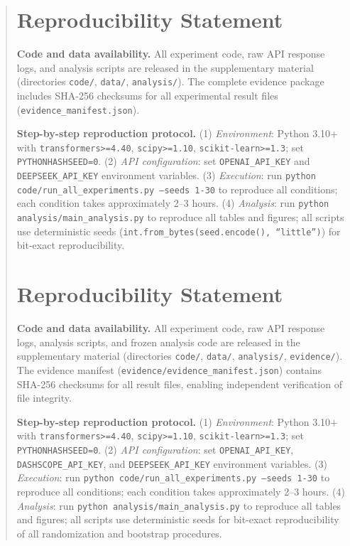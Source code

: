 \documentclass[11pt]{article}
\begin{document}
\begin{abstract}
\section*{Reproducibility Statement}

\textbf{Code and data availability.} All experiment code, raw API response logs, and analysis scripts are released in the supplementary material (directories \texttt{code/}, \texttt{data/}, \texttt{analysis/}). The complete evidence package includes SHA-256 checksums for all experimental result files (\texttt{evidence\_manifest.json}).

\textbf{Step-by-step reproduction protocol.} (1) \textit{Environment}: Python 3.10+ with \texttt{transformers>=4.40}, \texttt{scipy>=1.10}, \texttt{scikit-learn>=1.3}; set \texttt{PYTHONHASHSEED=0}. (2) \textit{API configuration}: set \texttt{OPENAI\_API\_KEY} and \texttt{DEEPSEEK\_API\_KEY} environment variables. (3) \textit{Execution}: run \texttt{python code/run\_all\_experiments.py --seeds 1-30} to reproduce all conditions; each condition takes approximately 2--3 hours. (4) \textit{Analysis}: run \texttt{python analysis/main\_analysis.py} to reproduce all tables and figures; all scripts use deterministic seeds (\texttt{int.from\_bytes(seed.encode(), ``little'')}) for bit-exact reproducibility.


\section*{Reproducibility Statement}
\label{sec:reproducibility}

\textbf{Code and data availability.} All experiment code, raw API response logs, analysis scripts, and frozen analysis code are released in the supplementary material (directories \texttt{code/}, \texttt{data/}, \texttt{analysis/}, \texttt{evidence/}). The evidence manifest (\texttt{evidence/evidence\_manifest.json}) contains SHA-256 checksums for all result files, enabling independent verification of file integrity.

\textbf{Step-by-step reproduction protocol.} (1) \textit{Environment}: Python 3.10+ with \texttt{transformers>=4.40}, \texttt{scipy>=1.10}, \texttt{scikit-learn>=1.3}; set \texttt{PYTHONHASHSEED=0}. (2) \textit{API configuration}: set \texttt{OPENAI\_API\_KEY}, \texttt{DASHSCOPE\_API\_KEY}, and \texttt{DEEPSEEK\_API\_KEY} environment variables. (3) \textit{Execution}: run \texttt{python code/run\_all\_experiments.py --seeds 1-30} to reproduce all conditions; each condition takes approximately 2--3 hours. (4) \textit{Analysis}: run \texttt{python analysis/main\_analysis.py} to reproduce all tables and figures; all scripts use deterministic seeds for bit-exact reproducibility of all randomization and bootstrap procedures.


\end{abstract}
\end{document}
